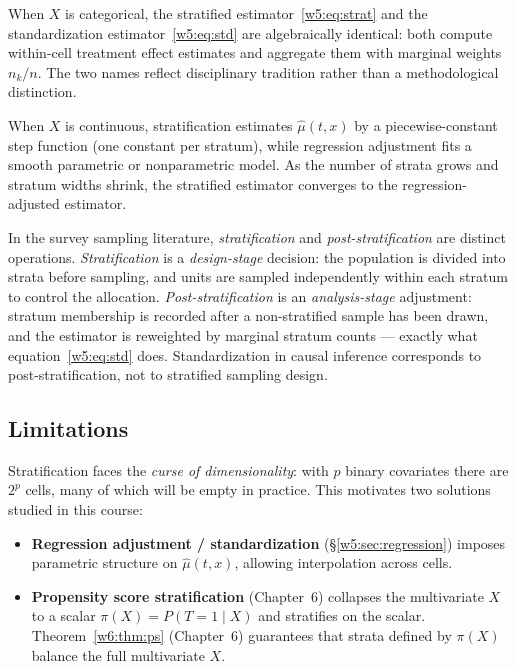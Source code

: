 \documentclass[master.tex]{subfiles}
\begin{document}
\begin{remark}
\label{w5:rem:strat-poststrat}
When $X$ is categorical, the stratified estimator~\eqref{w5:eq:strat}
and the standardization estimator~\eqref{w5:eq:std} are algebraically
identical: both compute within-cell treatment effect estimates and
aggregate them with marginal weights $n_k/n$.  The two names reflect
disciplinary tradition rather than a methodological distinction.

When $X$ is continuous, stratification estimates $\hat\mu(t,x)$ by a
piecewise-constant step function (one constant per stratum), while
regression adjustment fits a smooth parametric or nonparametric model.
As the number of strata grows and stratum widths shrink, the stratified
estimator converges to the regression-adjusted estimator.

In the survey sampling literature, \emph{stratification} and
\emph{post-stratification} are distinct operations.
\emph{Stratification} is a \emph{design-stage} decision: the
population is divided into strata before sampling, and units are
sampled independently within each stratum to control the allocation.
\emph{Post-stratification} is an \emph{analysis-stage} adjustment:
stratum membership is recorded after a non-stratified sample has been
drawn, and the estimator is reweighted by marginal stratum counts ---
exactly what equation~\eqref{w5:eq:std} does.  Standardization in
causal inference corresponds to post-stratification, not to
stratified sampling design.
\end{remark}

\subsection{Limitations}

Stratification faces the \emph{curse of dimensionality}: with $p$
binary covariates there are $2^p$ cells, many of which will be empty in
practice.  This motivates two solutions studied in this course:
\begin{itemize}
  \item \textbf{Regression adjustment / standardization} (§\ref{w5:sec:regression}) imposes
    parametric structure on $\hat\mu(t,x)$, allowing interpolation
    across cells.
  \item \textbf{Propensity score stratification} (Chapter~6) collapses
    the multivariate $X$ to a scalar $\pi(X) = P(T{=}1 \mid X)$ and
    stratifies on the scalar.  Theorem~\ref{w6:thm:ps} (Chapter~6)
    guarantees that strata defined by $\pi(X)$ balance the full
    multivariate $X$.
\end{itemize}
\end{document}
